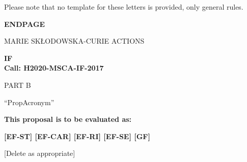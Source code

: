 \noindent
Please note that no template for these letters is provided, only general rules.





\newpage
\label{sec:endpage}
\vspace{15mm}
\begin{center}


        \Large{
      
     
        \textbf{ENDPAGE}
  
          \vspace{15mm}
          MARIE SK\L{}ODOWSKA-CURIE ACTIONS\\
          \vspace{1cm}
          
          \textbf{\acf{IF}}\\
          \textbf{Call: H2020-MSCA-IF-2017}
          \vspace{2cm}                   

          PART B
          \vspace{2.5cm}

          ``{\sc \ac{PropAcronym}\xspace}''
          \vspace{2cm}

          \textbf{This proposal is to be evaluated as:}
          \vspace{.5cm}

          \textbf{[EF-ST] [EF-CAR] [EF-RI] [EF-SE] [GF]}\\
        }
        \large{[Delete as appropriate]}

  \end{center}
\vspace{1cm}
